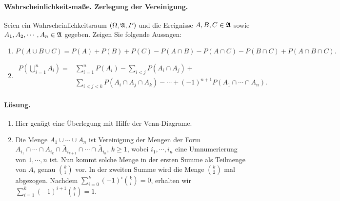 \paragraph{Wahrscheinlichkeitsmaße. Zerlegung der Vereinigung.} Seien ein
Wahrscheinlichkeitsraum $\left( \Omega, \mathfrak A, P \right)$ und die Ereignisse
$A,B,C\in \mathfrak A$ sowie $A_1, A_2, \cdots, A_n \in \mathfrak A$ gegeben.
Zeigen Sie folgende Aussagen:
\begin{enumerate}
    \item \begin{equation*}
            P \left( A \cup B \cup C \right) = 
            P(A)+P(B)+P(C) - P(A\cap B) - P(A\cap C) - P(B\cap C) + P(A\cap B \cap C). 
        \end{equation*}

    \item
        \begin{align*}
            P\left( \bigcup \limits_{i=1}^{n} A_i \right) =&
            \sum_{i=1}^{n} P(A_i) - \sum_{i<j} P(A_i \cap A_j) + \\
            & \sum_{i<j<k} P(A_i \cap A_j \cap A_k) - \cdots + 
            (-1)^{n+1} P\left( A_1 \cap \cdots \cap A_n \right). 
        \end{align*}
\end{enumerate}

\paragraph*{Lösung.} 
\begin{enumerate}
    \item Hier genügt eine Überlegung mit Hilfe der Venn-Diagrame. 

    \item Die Menge $A_1 \cup \cdots \cup A_n$ ist Vereinigung der Mengen der
        Form $A_{i_1} \cap \cdots \cap A_{i_k} \cap \bar A_{i_{k+1}} \cap
        \cdots \cap \bar A_{i_{n}}$, $k\geq 1$, wobei $i_1,\cdots, i_n$ eine
        Umnumerierung von $1, \cdots, n$ ist. Nun kommt solche Menge in der
        ersten Summe als Teilmenge von $A_i$ genau $\binom{k}{1}
        $ vor. In der zweiten Summe wird die Menge $\binom{k}{2}$ mal abgezogen. 
        Nachdem $\sum_{i=0}^{k} (-1)^{i} \binom{k}{i} = 0$, erhalten wir 
        $\sum_{i=1}^{k} (-1)^{i+1} \binom{k}{i}=1$.
\end{enumerate}



